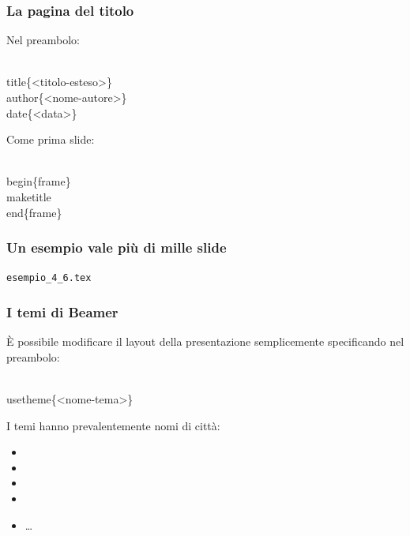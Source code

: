 \documentclass[svgnames,%
	ucs,%
	pdftex]{guitbeamer}
\begin{document}
\begin{frame}
  \frametitle{La pagina del titolo}
	Nel preambolo:
	\begin{LaTeXcode}
		\\title\{\alert{<titolo-esteso>}\}\n
		\\author\{\alert{<nome-autore>}\}\n
		\\date\{\alert{<data>}\}
	\end{LaTeXcode}
	Come prima slide:
	\begin{LaTeXcode}
		\\begin\{frame\}\n
		\hspace*{5ex}\alert{\\maketitle}\n
		\\end\{frame\}
	\end{LaTeXcode}
\end{frame}
\begin{frame}
  \frametitle{Un esempio vale pi\`u di mille slide}
	\begin{center}
		\alert{\texttt{esempio\_4\_6.tex}}
	\end{center}
\end{frame}
\begin{frame}
  \frametitle{I temi di Beamer}
	\`E possibile modificare il layout della presentazione semplicemente specificando nel preambolo:
	\begin{LaTeXcode}
		\\usetheme\{\alert{<nome-tema>}\}
	\end{LaTeXcode}
	I temi hanno prevalentemente nomi di citt\`a:
	\begin{itemize}
		\item {}
		\item {}
		\item {}
		\item {}
		\item \dots
	\end{itemize}
\end{frame}
\end{document}
